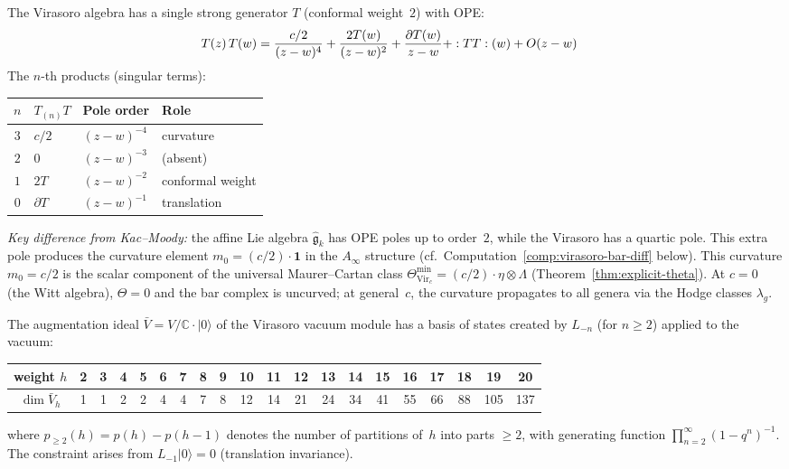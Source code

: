 \begin{computation}\label{comp:virasoro-ope}
The Virasoro algebra has a single strong generator $T$ (conformal weight~$2$) with OPE:
\begin{align*}
T(z)\,T(w) &= \frac{c/2}{(z-w)^4} + \frac{2T(w)}{(z-w)^2} + \frac{\partial T(w)}{z-w} + :{TT}:(w) + O(z-w)
\end{align*}
The $n$-th products (singular terms):
\begin{center}
\begin{tabular}{clll}
$n$ & $T_{(n)}T$ & Pole order & Role \\
\hline
$3$ & $c/2$ & $(z\!-\!w)^{-4}$ & curvature \\
$2$ & $0$ & $(z\!-\!w)^{-3}$ & (absent) \\
$1$ & $2T$ & $(z\!-\!w)^{-2}$ & conformal weight \\
$0$ & $\partial T$ & $(z\!-\!w)^{-1}$ & translation
\end{tabular}
\end{center}

\emph{Key difference from Kac--Moody:} the affine Lie algebra $\widehat{\mathfrak{g}}_k$ has OPE poles up to order~$2$, while the Virasoro has a quartic pole.  This extra pole produces the curvature element $m_0 = (c/2)\cdot\mathbf{1}$ in the $A_\infty$ structure (cf.\ Computation~\ref{comp:virasoro-bar-diff} below).
This curvature $m_0 = c/2$ is the scalar component of the
universal Maurer--Cartan class
$\Theta_{\mathrm{Vir}_c}^{\min} = (c/2)\cdot\eta\otimes\Lambda$
(Theorem~\ref{thm:explicit-theta}).  At $c = 0$ (the Witt algebra),
$\Theta = 0$ and the bar complex is uncurved; at general~$c$,
the curvature propagates to all genera via the Hodge classes $\lambda_g$.
\end{computation}

\begin{computation}\label{comp:virasoro-vacuum}
The augmentation ideal $\bar{V} = V/\mathbb{C}\cdot|0\rangle$ of the Virasoro vacuum module has a basis of states created by $L_{-n}$ (for $n \geq 2$) applied to the vacuum:
\begin{center}
{\small
\begin{tabular}{c|ccccccccccccccccccc}
weight $h$ & 2 & 3 & 4 & 5 & 6 & 7 & 8 & 9 & 10 & 11 & 12 & 13 & 14 & 15 & 16 & 17 & 18 & 19 & 20 \\
\hline
$\dim \bar{V}_h$ & 1 & 1 & 2 & 2 & 4 & 4 & 7 & 8 & 12 & 14 & 21 & 24 & 34 & 41 & 55 & 66 & 88 & 105 & 137
\end{tabular}
}
\end{center}
where $p_{\geq 2}(h) = p(h) - p(h-1)$ denotes the number of partitions of~$h$ into parts $\geq 2$, with generating function $\prod_{n=2}^{\infty}(1-q^n)^{-1}$.  The constraint arises from $L_{-1}|0\rangle = 0$ (translation invariance).
\end{computation}


